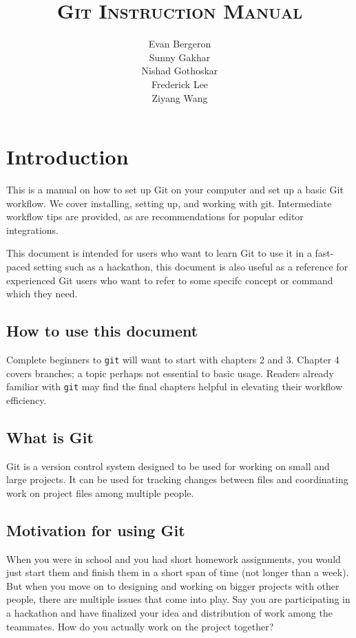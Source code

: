 \documentclass[12pt]{report}
\title{\scshape Git Instruction Manual}
\author{Evan Bergeron\\
Sunny Gakhar\\
Nishad Gothoskar\\
Frederick Lee\\
Ziyang Wang
}
\begin{document}
{\sffamily \maketitle }

\tableofcontents
\newpage
\chapter{Introduction}

This is a manual on how to set up Git on your computer and set up a basic Git workflow. We cover installing, setting up, and working with git. Intermediate workflow tips are provided, as are recommendations for popular editor integrations.

This document is intended for users who want to learn Git to use it in a fast-paced setting such as a hackathon, this document is also useful as a reference for experienced Git users who want to refer to some specifc concept or command which they need.

\section{How to use this document}

Complete beginners to \texttt{git} will want to start with chapters 2 and 3. Chapter 4 covers branches; a topic perhaps not essential to basic usage. Readers already familiar with \texttt{git} may find the final chapters helpful in elevating their workflow efficiency.

\section{What is Git}

Git is a version control system designed to be used for working on small and large projects. It can be used for tracking changes between files and coordinating work on project files among multiple people.

\section{Motivation for using Git}
When you were in school and you had short homework assignments, you would just start them and finish them in a short span of time (not longer than a week). But when you move on to designing and working on bigger projects with other people, there are multiple issues that come into play. Say you are participating in a hackathon and have finalized your idea and distribution of work among the teammates. How do you actually work on the project together? 
\end{document}
